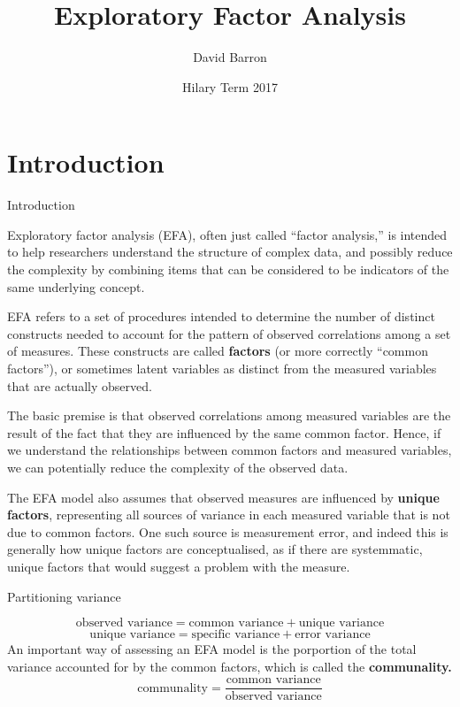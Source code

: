 \documentclass[10pt,ignorenonframetext,]{beamer}
\title{Exploratory Factor Analysis}
\author{David Barron}
\date{Hilary Term 2017}
\begin{document}
\frame{\titlepage}

\section{Introduction}\label{introduction}

\begin{frame}{Introduction}

Exploratory factor analysis (EFA), often just called ``factor
analysis,'' is intended to help researchers understand the structure of
complex data, and possibly reduce the complexity by combining items that
can be considered to be indicators of the same underlying concept.

EFA refers to a set of procedures intended to determine the number of
distinct constructs needed to account for the pattern of observed
correlations among a set of measures. These constructs are called
\textbf{factors} (or more correctly ``common factors''), or sometimes
latent variables as distinct from the measured variables that are
actually observed.

The basic premise is that observed correlations among measured variables
are the result of the fact that they are influenced by the same common
factor. Hence, if we understand the relationships between common factors
and measured variables, we can potentially reduce the complexity of the
observed data.

The EFA model also assumes that observed measures are influenced by
\textbf{unique factors}, representing all sources of variance in each
measured variable that is not due to common factors. One such source is
measurement error, and indeed this is generally how unique factors are
conceptualised, as if there are systemmatic, unique factors that would
suggest a problem with the measure.

\end{frame}

\begin{frame}{Partitioning variance}

\[
\text{observed variance} = \text{common variance} + \text{unique variance}
\] \[
\text{unique variance} = \text{specific variance} + \text{error variance}
\] An important way of assessing an EFA model is the porportion of the
total variance accounted for by the common factors, which is called the
\textbf{communality.} \[
\text{communality} = \frac{\text{common variance}}{\text{observed variance}}
\]

\end{frame}
\end{document}
